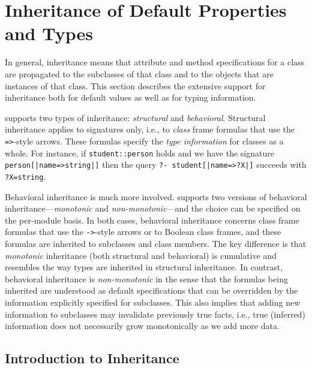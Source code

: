 \documentclass[11pt]{article}
\newcommand{\ERGO}{\mbox{\smaller{\ensuremath{\cal{E}}\smaller{{\sc{RGO}}}}}\xspace}
\newcommand{\FLSYSTEM}{\ERGO}
\begin{document}



\section{Inheritance of Default Properties and Types}\label{sec-inheritance}

In general, inheritance means that attribute and method specifications for
a class are propagated to the subclasses of that class and to the objects
that are instances of that class.
This section describes the extensive support for inheritance both for
default values as well as for typing information.

\FLSYSTEM supports two types of inheritance: \emph{structural} and
\emph{behavioral}.  Structural inheritance applies to signatures only,
i.e., to \emph{class} frame formulas that use the \texttt{=>}-style arrows.
These formulas specify the \emph{type information}   for classes as a whole.
For instance, if {\tt student::person} holds and we have the signature
\texttt{person[|name=>string|]} then the query {\tt ?- student[|name=>?X|]}
succeeds with {\tt ?X=string}.

Behavioral inheritance is much more involved.
\FLSYSTEM supports two versions of behavioral inheritance---\emph{monotonic}
and \emph{non-monotonic}---and the choice can be specified on the
per-module basis. In both cases, behavioral inheritance concerns
class frame formulas that use the \texttt{->}-style arrows or to Boolean class
frames, and these formulas are inherited to subclasses and class members.
The key difference is that \emph{monotonic} inheritance (both structural and
behavioral) is cumulative and
resembles the way types are inherited in structural inheritance.
In contrast, behavioral inheritance is \emph{non-monotonic} in the sense
that the formulas being inherited are understood as default specifications
that can be overridden by the information explicitly specified for subclasses.
This also implies that adding new information to subclasses may invalidate
previously true facts, i.e., true (inferred)
information does not necessarily grow monotonically  as we add more data.


\subsection{Introduction to Inheritance}
\end{document}
